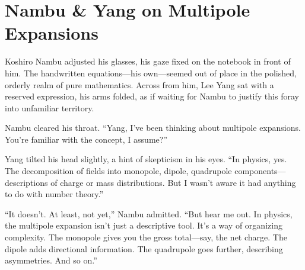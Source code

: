 % 
% 
% 
% 
\section*{Nambu \& Yang on Multipole Expansions}

Koshiro Nambu adjusted his glasses, his gaze fixed on the notebook in front of him. The handwritten equations—his own—seemed out of place in the polished, orderly realm of pure mathematics. Across from him, Lee Yang sat with a reserved expression, his arms folded, as if waiting for Nambu to justify this foray into unfamiliar territory.

Nambu cleared his throat. “Yang, I’ve been thinking about multipole expansions. You’re familiar with the concept, I assume?”

Yang tilted his head slightly, a hint of skepticism in his eyes. “In physics, yes. The decomposition of fields into monopole, dipole, quadrupole components—descriptions of charge or mass distributions. But I wasn’t aware it had anything to do with number theory.”

“It doesn’t. At least, not yet,” Nambu admitted. “But hear me out. In physics, the multipole expansion isn’t just a descriptive tool. It’s a way of organizing complexity. The monopole gives you the gross total—say, the net charge. The dipole adds directional information. The quadrupole goes further, describing asymmetries. And so on.”

